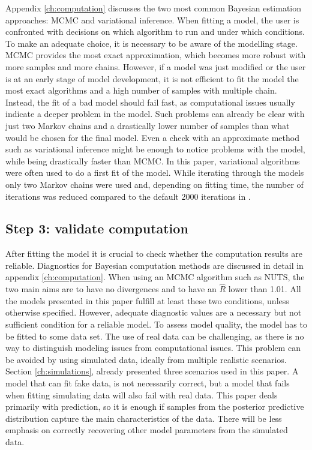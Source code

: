 Appendix \ref{ch:computation} discusses the two most common Bayesian estimation approaches: MCMC and variational inference.
When fitting a model, the user is confronted with decisions on which algorithm to run and under which conditions.
To make an adequate choice, it is necessary to be aware of the modelling stage.
MCMC provides the most exact approximation, which becomes more robust with more samples and more chains.
However, if a model was just modified or the user is at an early stage of model development, it is not efficient to fit the model the most exact algorithms and a high number of samples with multiple chain.
Instead, the fit of a bad model should fail fast, as computational issues usually indicate a deeper problem in the model.
Such problems can already be clear with just two Markov chains and a drastically lower number of samples than what would be chosen for the final model.
Even a check with an approximate method such as variational inference might be enough to notice problems with the model, while being drastically faster than MCMC.
In this paper, variational algorithms were often used to do a first fit of the model.
While iterating through the models only two Markov chains were used and, depending on fitting time, the number of iterations was reduced compared to the default 2000 iterations in  \cite{stan_development_team_stan_2021}.


\subsection{Step 3: validate computation}

After fitting the model it is crucial to check whether the computation results are reliable.
Diagnostics for Bayesian computation methods are discussed in detail in appendix \ref{ch:computation}.
When using an MCMC algorithm such as NUTS, the two main aims are to have no divergences and to have an $\hat R$ lower than 1.01.
All the models presented in this paper fulfill at least these two conditions, unless otherwise specified.
However, adequate diagnostic values are a necessary but not sufficient condition for a reliable model.
To assess model quality, the model has to be fitted to some data set.
The use of real data can be challenging, as there is no way to distinguish modeling issues from computational issues.
This problem can be avoided by using simulated data, ideally from multiple realistic scenarios.
Section \ref{ch:simulations}, already presented three scenarios used in this paper.
A model that can fit fake data, is not necessarily correct, but a model that fails when fitting simulating data will also fail with real data.
This paper deals primarily with prediction, so it is enough if samples from the posterior predictive distribution capture the main characteristics of the data.
There will be less emphasis on correctly recovering other model parameters from the simulated data.

